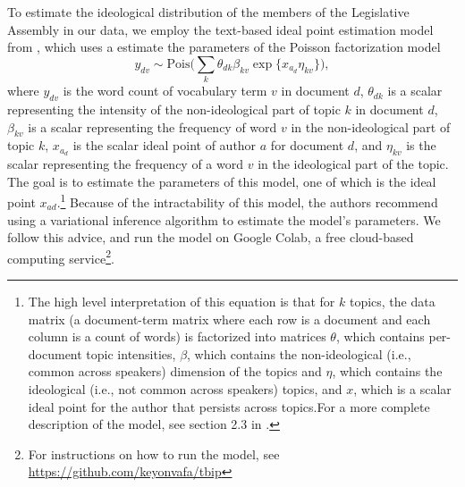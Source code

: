 \documentclass[12pt,letter]{article}
\begin{document}
To estimate the ideological distribution of the members of the Legislative Assembly in our data, we employ the text-based ideal point estimation model from \textcite{vafaTextBasedIdealPoints2020}, which uses a estimate the parameters of the Poisson factorization model
\[y_{dv} \sim \text{Pois}\big(\sum_k \theta_{dk} \beta_{kv} \exp\{x_{a_d}\eta _{kv}\}\big),\]
where \(y_{dv}\) is the word count of vocabulary term \(v\) in document \(d\), \(\theta_{dk}\) is a scalar representing the intensity of the non-ideological part of topic \(k\) in document \(d\), \(\beta_{kv}\) is a scalar representing the frequency of word \(v\) in the non-ideological part of topic \(k\), \(x_{a_d}\) is the scalar ideal point of author \(a\) for document \(d\), and \(\eta_{kv}\) is the scalar representing the frequency of a word \(v\) in the ideological part of the topic. The goal is to estimate the parameters of this model, one of which is the ideal point \(x_{ad}\).\footnote{The high level interpretation of this equation is that for \(k\) topics, the data matrix (a document-term matrix where each row is a document and each column is a count of words) is factorized into matrices \(\theta\), which contains per-document topic intensities, \(\beta\), which contains the non-ideological (i.e., common across speakers) dimension of the topics and \(\eta\), which contains the ideological (i.e., not common across speakers) topics, and \(x\), which is a scalar ideal point for the author that persists across topics.For a more complete description of the model, see section 2.3 in \textcite{vafaTextBasedIdealPoints2020}.} Because of the intractability of this model, the authors recommend using a variational inference algorithm to estimate the model's parameters. We follow this advice, and run the model on Google Colab, a free cloud-based computing service\footnote{For instructions on how to run the model, see \url{https://github.com/keyonvafa/tbip}}.
\end{document}
